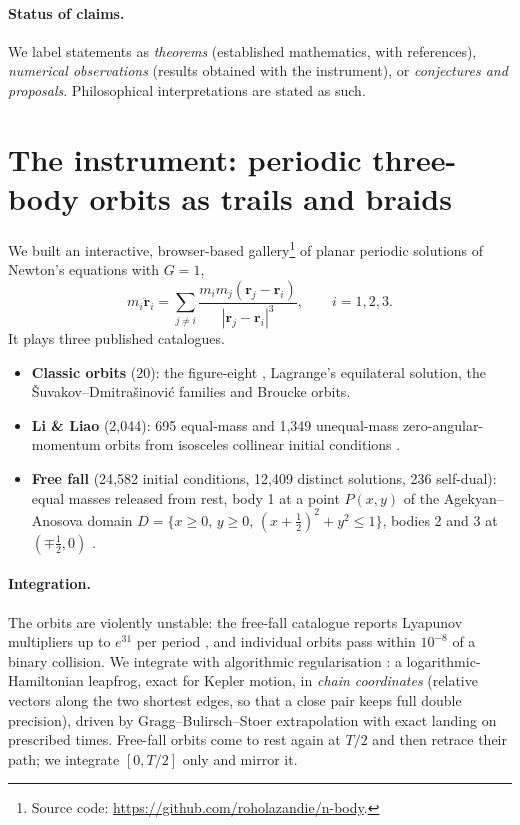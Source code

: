 \documentclass[11pt]{article}
\theoremstyle{remark}
\begin{document}
\paragraph{Status of claims.} We label statements as \emph{theorems} (established mathematics, with
references), \emph{numerical observations} (results obtained with the instrument), or \emph{conjectures and
proposals}. Philosophical interpretations are stated as such.

\section{The instrument: periodic three-body orbits as trails and braids}
\label{sec:instrument}

We built an interactive, browser-based gallery\footnote{Source code: \url{https://github.com/roholazandie/n-body}.}
of planar periodic solutions of Newton's equations with $G=1$,
\begin{equation}
  m_i\ddot{\mathbf r}_i=\sum_{j\neq i}\frac{m_im_j(\mathbf r_j-\mathbf r_i)}{|\mathbf r_j-\mathbf r_i|^3},
  \qquad i=1,2,3 .
\end{equation}
It plays three published catalogues.
\begin{itemize}[leftmargin=*]
\item \textbf{Classic orbits} (20): the figure-eight \cite{Moore1993,ChencinerMontgomery2000}, Lagrange's
      equilateral solution, the \v{S}uvakov--Dmitra\v{s}inovi\'c families \cite{SuvakovDmitrasinovic2013} and
      Broucke orbits.
\item \textbf{Li \& Liao} (2{,}044): 695 equal-mass and 1{,}349 unequal-mass zero-angular-momentum orbits
      from isosceles collinear initial conditions \cite{LiLiao2017,LiJingLiao2018}.
\item \textbf{Free fall} (24{,}582 initial conditions, 12{,}409 distinct solutions, 236 self-dual): equal
      masses released from rest, body 1 at a point $P(x,y)$ of the Agekyan--Anosova domain
      $D=\{x\ge0,\,y\ge0,\,(x+\tfrac12)^2+y^2\le1\}$, bodies 2 and 3 at $(\mp\tfrac12,0)$
      \cite{AgekyanAnosova1968,Hristov2024}.
\end{itemize}

\paragraph{Integration.} The orbits are violently unstable: the free-fall catalogue reports Lyapunov
multipliers up to $e^{31}$ per period \cite{Hristov2024}, and individual orbits pass within $10^{-8}$ of a
binary collision. We integrate with algorithmic regularisation \cite{MikkolaTanikawa1999a,MikkolaTanikawa1999b}:
a logarithmic-Hamiltonian leapfrog, exact for Kepler motion, in \emph{chain coordinates} (relative vectors
along the two shortest edges, so that a close pair keeps full double precision), driven by Gragg--Bulirsch--Stoer
extrapolation with exact landing on prescribed times. Free-fall orbits come to rest again at $T/2$ and then
retrace their path; we integrate $[0,T/2]$ only and mirror it.
\end{document}
